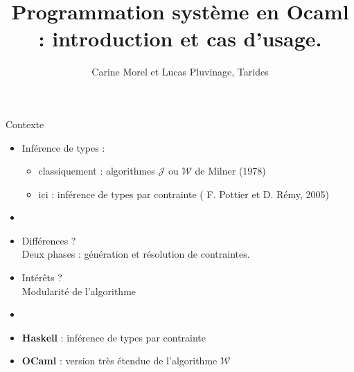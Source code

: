 \documentclass{beamer}
\title{Programmation système en Ocaml : introduction et cas d'usage.}
\author{Carine Morel et Lucas Pluvinage, Tarides}
\newcommand{\subtt}[1]{\textcolor{gray!30!cyan}{#1}}
\begin{document}
\maketitle


\begin{frame}{Contexte}
  \begin{itemize}
  \item<1-> Inférence de types :
    \begin{itemize}[label=$-$]
    \item classiquement : algorithmes $\mathcal{J}$ ou $\mathcal{W}$ de Milner (1978)
    \item ici : inférence de types par contrainte ( F. Pottier et D. Rémy, 2005)
    \end{itemize}
  \item<2->
  \item<2-> \subtt{Différences ?} \\
    Deux phases :  génération et résolution de contraintes.
  \item<2-> \subtt{Intérêts ?} \\Modularité de l'algorithme

  \item<3->
  \item<3-> \textbf{Haskell} : inférence de types par contrainte
  \item<3-> \textbf{OCaml} : version très étendue de l'algorithme $\mathcal{W}$
  \end{itemize}

\end{frame}
\end{document}

